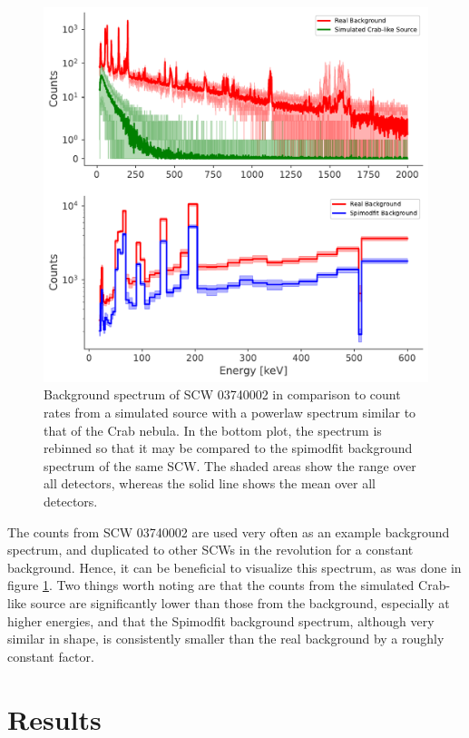 \documentclass{report}
\begin{document}
\begin{figure}[h]
  \centering
  \includegraphics[width=\textwidth]{Images/PPC_and_Background_Analysis/background_spectrum.pdf}
  \caption{Background spectrum of SCW 03740002 in comparison to count rates from a simulated source with a powerlaw spectrum similar to that of the Crab nebula. In the bottom plot, the spectrum is rebinned so that it may be compared to the spimodfit background spectrum of the same SCW. The shaded areas show the range over all detectors, whereas the solid line shows the mean over all detectors.}
  \label{fig back spec}
\end{figure}

The counts from SCW 03740002 are used very often as an example background spectrum, and duplicated to other SCWs in the revolution for a constant background. Hence, it can be beneficial to visualize this spectrum, as was done in figure \ref{fig back spec}. Two things worth noting are that the counts from the simulated Crab-like source are significantly lower than those from the background, especially at higher energies, and that the Spimodfit background spectrum, although very similar in shape, is consistently smaller than the real background by a roughly constant factor.


\chapter{Results}
\end{document}
